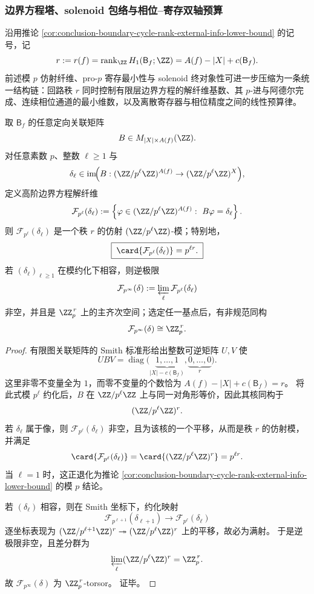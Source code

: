 \subsubsection{边界方程塔、solenoid 包络与相位--寄存双轴预算}\label{subsubsec:conclusion-boundary-padic-solenoid-phase-ledger}
沿用推论 \ref{cor:conclusion-boundary-cycle-rank-external-info-lower-bound} 的记号，记
\[
r:=r(f)=\operatorname{rank}_{\ZZ}H_1(\mathsf B_f;\ZZ)=A(f)-|X|+c(\mathsf B_f).
\]
前述模 \(p\) 仿射纤维、pro-\(p\) 寄存最小性与 solenoid 终对象性可进一步压缩为一条统一结构链：回路秩 \(r\) 同时控制有限层边界方程的解纤维基数、其 \(p\)-进与阿德尔完成、连续相位通道的最小维数，以及离散寄存器与相位精度之间的线性预算律。

\begin{theorem}[\(p\)-进边界方程塔与精确秩]\label{thm:conclusion-boundary-padic-tower-exact-rank}
取 \(\mathsf B_f\) 的任意定向关联矩阵
\[
B\in M_{|X|\times A(f)}(\ZZ).
\]
对任意素数 \(p\)、整数 \(\ell\ge 1\) 与
\[
\delta_\ell\in \operatorname{im}\!\Bigl(B:(\ZZ/p^\ell\ZZ)^{A(f)}\to (\ZZ/p^\ell\ZZ)^{X}\Bigr),
\]
定义高阶边界方程解纤维
\[
\mathcal F_{p^\ell}(\delta_\ell)
:=
\left\{
\varphi\in (\ZZ/p^\ell\ZZ)^{A(f)}:\ B\varphi=\delta_\ell
\right\}.
\]
则 \(\mathcal F_{p^\ell}(\delta_\ell)\) 是一个秩 \(r\) 的仿射 \((\ZZ/p^\ell\ZZ)\)-模；特别地，
\[
\boxed{\;
\card{\mathcal F_{p^\ell}(\delta_\ell)}=p^{\ell r}.
\;}
\]
若 \((\delta_\ell)_{\ell\ge 1}\) 在模约化下相容，则逆极限
\[
\mathcal F_{p^\infty}(\delta)
:=
\varprojlim_{\ell}\mathcal F_{p^\ell}(\delta_\ell)
\]
非空，并且是 \(\ZZ_p^{\,r}\) 上的主齐次空间；选定任一基点后，有非规范同构
\[
\mathcal F_{p^\infty}(\delta)\cong \ZZ_p^{\,r}.
\]
\end{theorem}
\begin{proof}
有限图关联矩阵的 Smith 标准形给出整数可逆矩阵 \(U,V\) 使
\[
UBV=\operatorname{diag}\!\bigl(
\underbrace{1,\dots,1}_{|X|-c(\mathsf B_f)},
\underbrace{0,\dots,0}_{r}
\bigr).
\]
这里非零不变量全为 \(1\)，而零不变量的个数恰为
\(
A(f)-|X|+c(\mathsf B_f)=r
\)。
将此式模 \(p^\ell\) 约化后，\(B\) 在 \(\ZZ/p^\ell\ZZ\) 上与同一对角形等价，因此其核同构于
\[
(\ZZ/p^\ell\ZZ)^{r}.
\]
若 \(\delta_\ell\) 属于像，则 \(\mathcal F_{p^\ell}(\delta_\ell)\) 非空，且为该核的一个平移，从而是秩 \(r\) 的仿射模，并满足
\[
\card{\mathcal F_{p^\ell}(\delta_\ell)}
=
\card{(\ZZ/p^\ell\ZZ)^r}
=
p^{\ell r}.
\]
当 \(\ell=1\) 时，这正退化为推论 \ref{cor:conclusion-boundary-cycle-rank-external-info-lower-bound} 的模 \(p\) 结论。

若 \((\delta_\ell)\) 相容，则在 Smith 坐标下，约化映射
\[
\mathcal F_{p^{\ell+1}}(\delta_{\ell+1})\to \mathcal F_{p^\ell}(\delta_\ell)
\]
逐坐标表现为
\(
(\ZZ/p^{\ell+1}\ZZ)^r\twoheadrightarrow(\ZZ/p^\ell\ZZ)^r
\)
上的平移，故必为满射。
于是逆极限非空，且差分群为
\[
\varprojlim_\ell(\ZZ/p^\ell\ZZ)^r=\ZZ_p^{\,r}.
\]
故 \(\mathcal F_{p^\infty}(\delta)\) 为 \(\ZZ_p^{\,r}\)-torsor。
证毕。
\end{proof}

